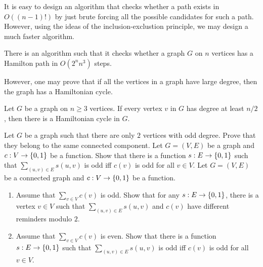 It is easy to design an algorithm that checks whether a path exists in
$O((n - 1)!)$ by just brute forcing all the possible candidates for such a path.
However, using the ideas of the inclusion-exclustion principle, we may design
a much faster algorithm.
\begin{theorem}
  There is an algorithm such that it checks whether a graph $G$ on $n$ vertices
  has a Hamilton path in $O(2^n n^3)$ steps.
\end{theorem}

However, one may prove that if all the vertices in a graph have large degree,
then the graph has a Hamiltonian cycle.
\begin{theorem}[Dirac]
  Let $G$ be a graph on $n \ge 3$ vertices. If every vertex $v$ in $G$ has
  degree at least $n / 2$, then there is a Hamiltonian cycle in $G$.
\end{theorem}

\begin{chapterendexercises}
  \exercise[recommended] Let $G$ be a graph such that there are only $2$
    vertices with odd degree. Prove that they belong to the same connected
    component.
  \exercise Let $G = (V, E)$ be a graph and $c : V \to \set{0, 1}$ be a
    function. Show that there is a function $s : E \to \set{0, 1}$
    such that $\sum_{(u, v) \in E} s(u, v)$ is odd iff $c(v)$ is odd
    for all $v \in V$.
  \exercise Let $G = (V, E)$ be a connected graph and $c : V \to \set{0, 1}$
    be a function.
    \begin{enumerate}
      \item Assume that $\sum_{v \in V} c(v)$ is odd.
        Show that for any $s : E \to \set{0, 1}$, there is a vertex
        $v \in V$ such that $\sum_{(u, v) \in E} s(u, v)$ and $c(v)$
        have different reminders modulo $2$.
      \item Assume that $\sum_{v \in V} c(v)$ is even.
        Show that there is a function $s : E \to \set{0, 1}$
        such that $\sum_{(u, v) \in E} s(u, v)$ is odd iff $c(v)$ is odd
        for all $v \in V$.
    \end{enumerate}
\end{chapterendexercises}
